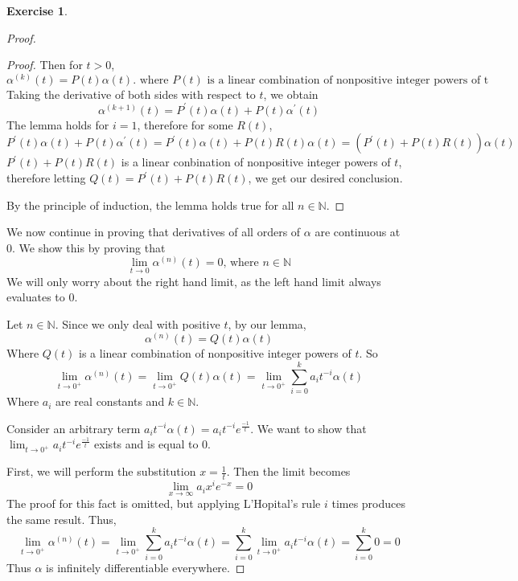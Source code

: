 \documentclass{article}
\theoremstyle{plain} %
\numberwithin{thm}{section} %
\theoremstyle{definition}
\newtheorem{exercise}[thm]{Exercise} %
\begin{document}
\begin{exercise}
\begin{enumerate}[label=(\alph*)]
\begin{proof}
\begin{proof}
                    Then for \(t > 0\),
                    \[
                        \alpha ^{(k)}(t) = P(t)\alpha (t). \text{ where } P(t) \text{ is a linear combination of nonpositive integer powers of t}
                    \]
                    Taking the derivative of both sides with respect to \(t\), we obtain
                    \[
                        \alpha ^{(k+1)}(t) = P^\prime(t)\alpha (t) + P(t)\alpha ^\prime (t)
                    \]
                    The lemma holds for \(i = 1\), therefore for some \(R(t)\),
                    \[
                        P^\prime(t)\alpha (t) + P(t)\alpha ^\prime (t) = P^\prime(t)\alpha (t) + P(t)R(t)\alpha (t) = (P^\prime(t) + P(t)R(t))\alpha (t)
                    \]
                    \(P^\prime(t) + P(t)R(t)\) is a linear conbination of nonpositive integer powers of \(t\), therefore letting \(Q(t) = P^\prime(t) + P(t)R(t)\), we get our desired conclusion.

                    By the principle of induction, the lemma holds true for all \(n \in \mathbb{N}\).

                \end{proof}

                We now continue in proving that derivatives of all orders of \(\alpha\) are continuous at 0. We show this by proving that
                \[
                    \lim_{t \to 0} \alpha ^{(n)}(t) = 0 \text{, where } n \in \mathbb{N}
                \]
                We will only worry about the right hand limit, as the left hand limit always evaluates to \(0\).

                Let \(n \in \mathbb{N}\). Since we only deal with positive \(t\), by our lemma,
                \[
                    \alpha ^{(n)}(t) = Q(t)\alpha (t)
                \]
                Where \(Q(t)\) is a linear combination of nonpositive integer powers of \(t\). So
                \[
                    \lim_{t \to 0^+} \alpha ^{(n)}(t) = \lim_{t \to 0^+} Q(t)\alpha (t) = \lim_{t \to 0^+} \sum_{i=0}^k a_i t^{-i} \alpha (t)
                \]
                Where \(a_i\) are real constants and \(k \in \mathbb{N}\).

                Consider an arbitrary term \(a_i t^{-i} \alpha (t) = a_i t^{-i} e^\frac{-1}{t}\). We want to show that \(\lim_{t \to 0^+}a_i t^{-i} e^\frac{-1}{t}\) exists and is equal to 0.

                First, we will perform the substitution \(x = \frac{1}{t}\). Then the limit becomes
                \[
                    \lim_{x \to \infty} a_i x^i e^{-x} = 0
                \]
                The proof for this fact is omitted, but applying L'Hopital's rule \(i\) times produces the same result. Thus,
                \[
                    \lim_{t \to 0^+} \alpha ^{(n)}(t) = \lim_{t \to 0^+} \sum_{i=0}^k a_i t^{-i} \alpha (t) = \sum_{i=0} ^k \lim_{t \to 0^+} a_i t^{-i} \alpha (t) = \sum_{i=0} ^k 0 = 0
                \]
                Thus \(\alpha \) is infinitely differentiable everywhere.


\end{proof}
\end{enumerate}
\end{exercise}
\end{document}
